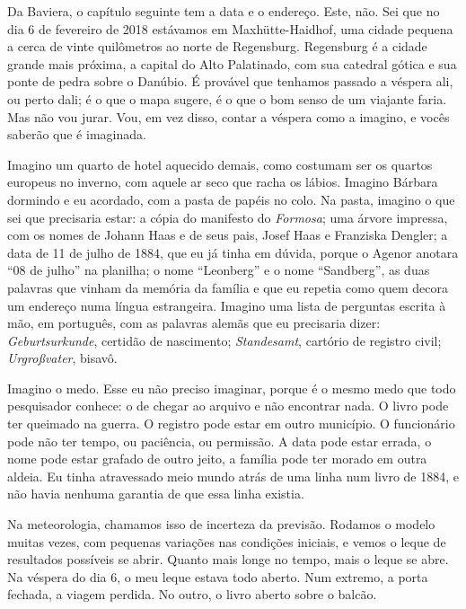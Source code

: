 \documentclass[
  brazilian,
  11pt,
  openany]{book}
\begin{document}
Da Baviera, o capítulo seguinte tem a data e o endereço. Este, não. Sei
que no dia 6 de fevereiro de 2018 estávamos em Maxhütte-Haidhof, uma
cidade pequena a cerca de vinte quilômetros ao norte de Regensburg.
Regensburg é a cidade grande mais próxima, a capital do Alto Palatinado,
com sua catedral gótica e sua ponte de pedra sobre o Danúbio. É provável
que tenhamos passado a véspera ali, ou perto dali; é o que o mapa
sugere, é o que o bom senso de um viajante faria. Mas não vou jurar.
Vou, em vez disso, contar a véspera como a imagino, e vocês saberão que
é imaginada.

Imagino um quarto de hotel aquecido demais, como costumam ser os quartos
europeus no inverno, com aquele ar seco que racha os lábios. Imagino
Bárbara dormindo e eu acordado, com a pasta de papéis no colo. Na pasta,
imagino o que sei que precisaria estar: a cópia do manifesto do
\emph{Formosa}; uma árvore impressa, com os nomes de Johann Haas e de
seus pais, Josef Haas e Franziska Dengler; a data de 11 de julho de
1884, que eu já tinha em dúvida, porque o Agenor anotara ``08 de julho''
na planilha; o nome ``Leonberg'' e o nome ``Sandberg'', as duas palavras
que vinham da memória da família e que eu repetia como quem decora um
endereço numa língua estrangeira. Imagino uma lista de perguntas escrita
à mão, em português, com as palavras alemãs que eu precisaria dizer:
\emph{Geburtsurkunde}, certidão de nascimento; \emph{Standesamt},
cartório de registro civil; \emph{Urgroßvater}, bisavô.

Imagino o medo. Esse eu não preciso imaginar, porque é o mesmo medo que
todo pesquisador conhece: o de chegar ao arquivo e não encontrar nada. O
livro pode ter queimado na guerra. O registro pode estar em outro
município. O funcionário pode não ter tempo, ou paciência, ou permissão.
A data pode estar errada, o nome pode estar grafado de outro jeito, a
família pode ter morado em outra aldeia. Eu tinha atravessado meio mundo
atrás de uma linha num livro de 1884, e não havia nenhuma garantia de
que essa linha existia.

Na meteorologia, chamamos isso de incerteza da previsão. Rodamos o
modelo muitas vezes, com pequenas variações nas condições iniciais, e
vemos o leque de resultados possíveis se abrir. Quanto mais longe no
tempo, mais o leque se abre. Na véspera do dia 6, o meu leque estava
todo aberto. Num extremo, a porta fechada, a viagem perdida. No outro, o
livro aberto sobre o balcão.
\end{document}
